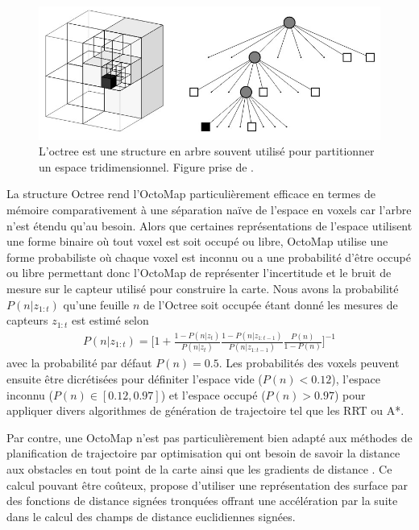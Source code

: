 \begin{figure}[h]
  \centering
  \includegraphics[width=0.5\linewidth]{images/octree.jpg}
  \caption[Représentation graphique d'une Octree]{L'octree est une structure en arbre souvent utilisé pour partitionner un espace tridimensionnel. Figure prise de \citep{Hornung2013}.}
  \label{fig:octree}
\end{figure}

La structure Octree rend l'OctoMap particulièrement efficace en termes de mémoire comparativement à une séparation naïve de l'espace en voxels car l'arbre n'est étendu qu'au besoin. Alors que certaines représentations de l'espace utilisent une forme binaire où tout voxel est soit occupé ou libre, OctoMap utilise une forme probabiliste où chaque voxel est inconnu ou a une probabilité d'être occupé ou libre permettant donc l'OctoMap de représenter l'incertitude et le bruit de mesure sur le capteur utilisé pour construire la carte. Nous avons la probabilité $P(n|z_{1:t})$ qu'une feuille $n$ de l'Octree soit occupée étant donné les mesures de capteurs $z_{1:t}$ est estimé selon
\begin{align}
  P(n|z_{1:t}) = \Bigg[ 1 +
    \frac{1 - P(n|z_{t})}{P(n|z_{t})}
    \frac{1 - P(n|z_{1:t-1})}{P(n|z_{1:t-1})}
    \frac{P(n)}{1 - P(n)}
  \Bigg]^{-1}
  \label{eq:octomap_probability}
\end{align}
avec la probabilité par défaut $P(n) = 0.5$. Les probabilités des voxels peuvent ensuite être dicrétisées pour définiter l'espace vide ($P(n) < 0.12$), l'espace inconnu ($P(n) \in [0.12, 0.97]$) et l'espace occupé ($P(n) > 0.97$) pour appliquer divers algorithmes de génération de trajectoire tel que les RRT ou A*.

Par contre, une OctoMap n'est pas particulièrement bien adapté aux méthodes de planification de trajectoire par optimisation qui ont besoin de savoir la distance aux obstacles en tout point de la carte ainsi que les gradients de distance \citep{ratliff2009chomp, Oleynikova2016}. Ce calcul pouvant être coûteux, \cite{oleynikova2017voxblox} propose d'utiliser une représentation des surface par des fonctions de distance signées tronquées offrant une accélération par la suite dans le calcul des champs de distance euclidiennes signées.

